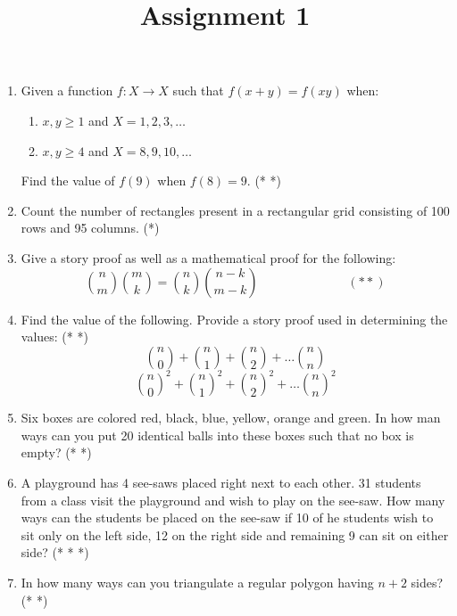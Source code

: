 \documentclass[a4paper]{article}
\title{Assignment 1}
\date{\displaydate{date}}
\begin{document}
\maketitle

\begin{enumerate}
\item Given a function $f:X \rightarrow X$ such that $f(x+y)=f(xy)$ when:
\begin{enumerate}
\item $x,y \geq 1$ and $X={1,2,3,\dots}$
\item $x,y \geq 4$ and $X={8,9,10,\dots}$
\end{enumerate}
Find the value of $f(9)$ when $f(8)=9$. (* *)

\item Count  the number of rectangles present in a rectangular grid consisting of 100 rows and 95 columns. (*)

\item Give a story proof as well as a mathematical proof for the following:
\begin{equation}
{n \choose m}{m \choose k} = {n \choose k} {{n-k} \choose {m-k}} \hspace{3cm}(* *)
\end{equation}

\item Find the value of the following. Provide a story proof used in determining the values: (* *)
\begin{equation}
{n \choose 0} + {n \choose 1} + {n \choose 2} + \dots {n \choose n}
\end{equation}
\begin{equation}
{n \choose 0}^2 + {n \choose 1}^2 + {n \choose 2}^2 + \dots {n \choose n}^2
\end{equation}

\item Six boxes are colored red, black, blue, yellow, orange and green. In how man ways can you put 20 identical balls into these boxes such that no box is empty? (* *)

\item A playground has 4 see-saws placed right next to each other. 31 students from a class visit the playground and wish to play on the see-saw. How many ways can the students be placed on the see-saw if 10 of he students wish to sit only on the left side, 12 on the right side and remaining 9 can sit on either side? (* * *)

\item In how many ways can you triangulate a regular polygon having $n+2$ sides? (* *)


\end{enumerate}
\end{document}
